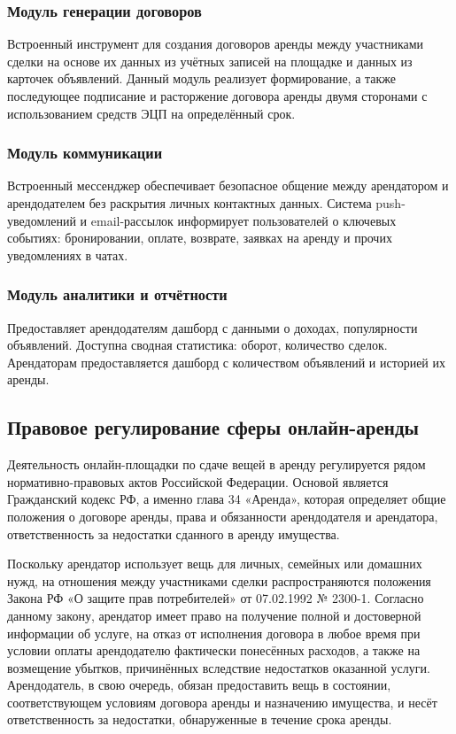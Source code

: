 \subsubsection{Модуль генерации договоров}
Встроенный инструмент для создания договоров аренды между участниками сделки на основе их данных из учётных записей на площадке и данных из карточек объявлений. Данный модуль реализует формирование, а также последующее подписание и расторжение договора аренды двумя сторонами с использованием средств ЭЦП на определённый срок.
\subsubsection{Модуль коммуникации}
Встроенный мессенджер обеспечивает безопасное общение между арендатором и арендодателем без раскрытия личных контактных данных. Система push-уведомлений и email-рассылок информирует пользователей о ключевых событиях: бронировании, оплате, возврате, заявках на аренду и прочих уведомлениях в чатах.
\subsubsection{Модуль аналитики и отчётности}
Предоставляет арендодателям дашборд с данными о доходах, популярности объявлений. Доступна сводная статистика: оборот, количество сделок. Арендаторам предоставляется дашборд с количеством объявлений и историей их аренды.

\subsection{Правовое регулирование сферы онлайн-аренды}

Деятельность онлайн-площадки по сдаче вещей в аренду регулируется рядом нормативно-правовых актов Российской Федерации. Основой является Гражданский кодекс РФ, а именно глава 34 «Аренда», которая определяет общие положения о договоре аренды, права и обязанности арендодателя и арендатора, ответственность за недостатки сданного в аренду имущества.\cite{zakon2}

Поскольку арендатор использует вещь для личных, семейных или домашних нужд, на отношения между участниками сделки распространяются положения Закона РФ «О защите прав потребителей» от 07.02.1992 № 2300-1. Согласно данному закону, арендатор имеет право на получение полной и достоверной информации об услуге, на отказ от исполнения договора в любое время при условии оплаты арендодателю фактически понесённых расходов, а также на возмещение убытков, причинённых вследствие недостатков оказанной услуги. Арендодатель, в свою очередь, обязан предоставить вещь в состоянии, соответствующем условиям договора аренды и назначению имущества, и несёт ответственность за недостатки, обнаруженные в течение срока аренды.\cite{zakon1}

